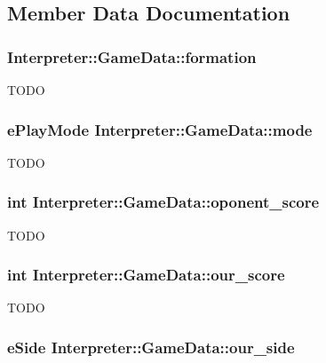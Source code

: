 \subsection{Member Data Documentation}
\hypertarget{structInterpreter_1_1GameData_a1f97ae8675219e99c79735a7d9c3744b}{
\subsubsection[{formation}]{ {\bf Interpreter::GameData::formation}}}
\label{structInterpreter_1_1GameData_a1f97ae8675219e99c79735a7d9c3744b}
TODO \hypertarget{structInterpreter_1_1GameData_a8db07331590b8e0acea1af74125073c0}{
\subsubsection[{mode}]{\setlength{\rightskip}{0pt plus 5cm}ePlayMode {\bf Interpreter::GameData::mode}}}
\label{structInterpreter_1_1GameData_a8db07331590b8e0acea1af74125073c0}
TODO \hypertarget{structInterpreter_1_1GameData_adae988f2e4ebdf1d6b04d36a85f76708}{
\subsubsection[{oponent\_\-score}]{\setlength{\rightskip}{0pt plus 5cm}int {\bf Interpreter::GameData::oponent\_\-score}}}
\label{structInterpreter_1_1GameData_adae988f2e4ebdf1d6b04d36a85f76708}
TODO \hypertarget{structInterpreter_1_1GameData_a0889548c1244e619028c24f7e8b1a9a7}{
\subsubsection[{our\_\-score}]{\setlength{\rightskip}{0pt plus 5cm}int {\bf Interpreter::GameData::our\_\-score}}}
\label{structInterpreter_1_1GameData_a0889548c1244e619028c24f7e8b1a9a7}
TODO \hypertarget{structInterpreter_1_1GameData_a92de919c4addb12feda7a29e40b95132}{
\subsubsection[{our\_\-side}]{\setlength{\rightskip}{0pt plus 5cm}eSide {\bf Interpreter::GameData::our\_\-side}}}
